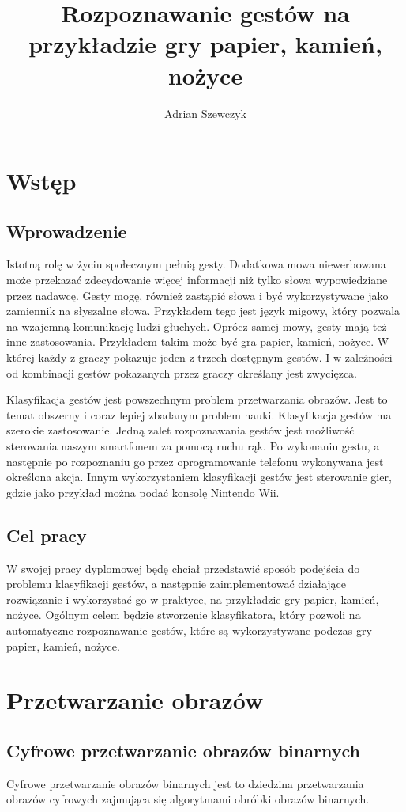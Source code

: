 \documentclass[a4paper,12pt,twoside,openany]{report}
\title{Rozpoznawanie gestów na przykładzie gry papier, kamień, nożyce}
\author{Adrian Szewczyk}
\begin{document}
\maketitle


\chapter{Wstęp}
\section{Wprowadzenie}
Istotną rolę w życiu społecznym pełnią gesty. Dodatkowa mowa niewerbowana może przekazać zdecydowanie więcej informacji niż tylko słowa wypowiedziane przez nadawcę. Gesty mogę, również zastąpić słowa i być wykorzystywane jako zamiennik na słyszalne słowa. Przykładem tego jest język migowy, który pozwala na wzajemną komunikację ludzi głuchych. Oprócz samej mowy, gesty mają też inne zastosowania. Przykładem takim może być gra papier, kamień, nożyce. W której każdy z graczy pokazuje jeden z trzech dostępnym gestów. I w zależności od kombinacji gestów pokazanych przez graczy określany jest zwycięzca.

Klasyfikacja gestów jest powszechnym problem przetwarzania obrazów. Jest to temat obszerny i coraz lepiej zbadanym problem nauki. Klasyfikacja gestów ma szerokie zastosowanie. Jedną zalet rozpoznawania gestów jest możliwość sterowania naszym smartfonem za pomocą ruchu rąk. Po wykonaniu gestu, a następnie po rozpoznaniu go przez  oprogramowanie telefonu wykonywana jest określona akcja. Innym wykorzystaniem klasyfikacji gestów jest sterowanie gier, gdzie jako przykład można podać konsolę Nintendo Wii.

\section{Cel pracy}
W swojej pracy dyplomowej będę chciał przedstawić sposób podejścia do problemu klasyfikacji gestów, a następnie zaimplementować działające rozwiązanie i wykorzystać go w praktyce, na przykładzie gry papier, kamień, nożyce. Ogólnym celem będzie stworzenie klasyfikatora, który pozwoli na automatyczne rozpoznawanie gestów, które są wykorzystywane podczas gry papier, kamień, nożyce.

\chapter{Przetwarzanie obrazów}
\section{Cyfrowe przetwarzanie obrazów binarnych}
Cyfrowe przetwarzanie obrazów binarnych jest to dziedzina przetwarzania obrazów cyfrowych zajmująca się algorytmami obróbki obrazów binarnych. 
\end{document}

